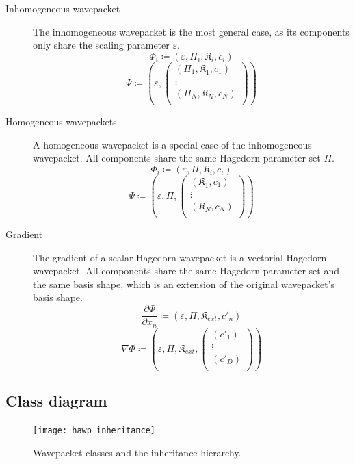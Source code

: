 \documentclass{article}
\begin{document}
\begin{description}
\item[Inhomogeneous wavepacket]
  The inhomogeneous wavepacket is the most general case, as its components only share
  the scaling parameter \(\varepsilon\).
  \[
    \Phi_i \coloneqq  (\varepsilon, \Pi_i, \mathfrak{K}_i, c_i) \] \[
    \Psi \coloneqq  \left(\varepsilon, 
    \begin{pmatrix}
      (\Pi_1, \mathfrak{K}_1, c_1) \\
      \vdots \\
      (\Pi_N, \mathfrak{K}_N, c_N) \\
    \end{pmatrix}\right)
  \]
\item[Homogeneous wavepackets]
  A homogeneous wavepacket is a special case of the inhomogeneous wavepacket.
  All components share the same Hagedorn parameter set \(\Pi\).
  \[
    \Phi_i \coloneqq  (\varepsilon, \Pi, \mathfrak{K}_i, c_i) \] \[
    \Psi \coloneqq  \left(\varepsilon, \Pi,
    \begin{pmatrix}
      (\mathfrak{K}_1, c_1) \\
      \vdots \\
      (\mathfrak{K}_N, c_N) \\
    \end{pmatrix}\right)
  \]
\item[Gradient]
  The gradient of a scalar Hagedorn wavepacket is a vectorial Hagedorn
  wavepacket. All components share the same Hagedorn parameter set and the
  same basis shape, which is an extension of the original wavepacket's basis shape.
  \[
    \frac{\partial \Phi}{\partial x_n} \coloneqq  (\varepsilon, \Pi, \mathfrak{K}_{ext}, c'_n) \] \[
    \nabla \Phi \coloneqq  \left(\varepsilon, \Pi, \mathfrak{K}_{ext},
    \begin{pmatrix}
      (c'_1) \\
      \vdots \\
      (c'_D) \\
    \end{pmatrix}\right)
  \]
\end{description}

\subsection{Class diagram}

\begin{figure}[H]
  \centering
  \texttt{[image: hawp\_inheritance]}
  \caption{Wavepacket classes and the inheritance hierarchy.}
  \label{fig:hawp_inheritance}
\end{figure}
\end{document}
